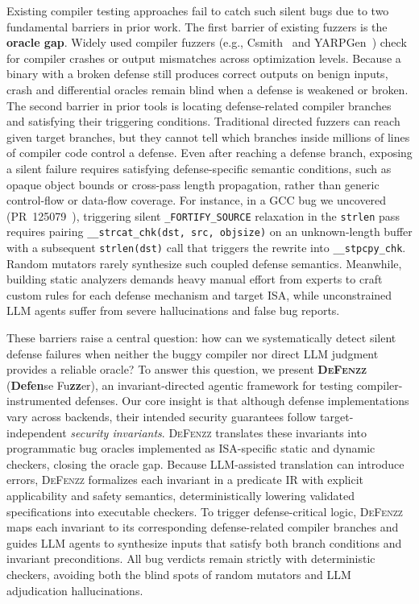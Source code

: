 \documentclass[conference]{IEEEtran}
\begin{document}
Existing compiler testing approaches fail to catch such silent bugs due to two fundamental barriers in prior work. The first barrier of existing fuzzers is the \textbf{oracle gap}. Widely used compiler fuzzers (e.g., Csmith~\cite{yang2011csmith} and YARPGen~\cite{livinskii2020yarpgen}) check for compiler crashes or output mismatches across optimization levels. Because a binary with a broken defense still produces correct outputs on benign inputs, crash and differential oracles remain blind when a defense is weakened or broken. The second barrier in prior tools is locating defense-related compiler branches and satisfying their triggering conditions. Traditional directed fuzzers can reach given target branches, but they cannot tell which branches inside millions of lines of compiler code control a defense. Even after reaching a defense branch, exposing a silent failure requires satisfying defense-specific semantic conditions, such as opaque object bounds or cross-pass length propagation, rather than generic control-flow or data-flow coverage. For instance, in a GCC bug we uncovered (PR~125079~\cite{gccpr125079}), triggering silent \texttt{\_FORTIFY\_SOURCE} relaxation in the \texttt{strlen} pass requires pairing \texttt{\_\_strcat\_chk(dst, src, objsize)} on an unknown-length buffer with a subsequent \texttt{strlen(dst)} call that triggers the rewrite into \texttt{\_\_stpcpy\_chk}. Random mutators rarely synthesize such coupled defense semantics. Meanwhile, building static analyzers demands heavy manual effort from experts to craft custom rules for each defense mechanism and target ISA, while unconstrained LLM agents suffer from severe hallucinations and false bug reports.

These barriers raise a central question: how can we systematically detect silent defense failures when neither the buggy compiler nor direct LLM judgment provides a reliable oracle? To answer this question, we present \textbf{\textsc{DeFenzz}} (\textbf{Defen}se Fu\textbf{zz}er), an invariant-directed agentic framework for testing compiler-instrumented defenses. Our core insight is that although defense implementations vary across backends, their intended security guarantees follow target-independent \emph{security invariants}. \textsc{DeFenzz} translates these invariants into programmatic bug oracles implemented as ISA-specific static and dynamic checkers, closing the oracle gap. Because LLM-assisted translation can introduce errors, \textsc{DeFenzz} formalizes each invariant in a predicate IR with explicit applicability and safety semantics, deterministically lowering validated specifications into executable checkers. To trigger defense-critical logic, \textsc{DeFenzz} maps each invariant to its corresponding defense-related compiler branches and guides LLM agents to synthesize inputs that satisfy both branch conditions and invariant preconditions. All bug verdicts remain strictly with deterministic checkers, avoiding both the blind spots of random mutators and LLM adjudication hallucinations.
\end{document}
